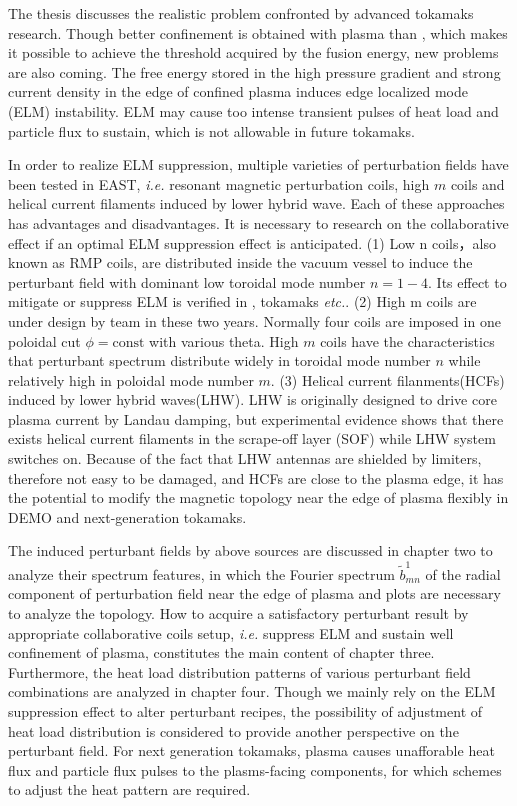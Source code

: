 \begin{eabstract}
  The thesis discusses the realistic problem confronted by advanced tokamaks research. Though better confinement is obtained with \Hmode plasma than \Lmode, which makes it possible to achieve the threshold acquired by the fusion energy, new problems are also coming. The free energy stored in the high pressure gradient and strong current density in the edge of confined plasma induces edge localized mode (ELM) instability. ELM may cause too intense transient pulses of heat load and particle flux to sustain, which is not allowable in future tokamaks.

  In order to realize ELM suppression, multiple varieties of perturbation fields have been tested in EAST, \textit{i.e.} resonant magnetic perturbation coils, high $m$ coils and helical current filaments induced by lower hybrid wave. Each of these approaches has advantages and disadvantages. It is necessary to research on the collaborative effect if an optimal ELM suppression effect is anticipated. (1) Low n coils，also known as RMP coils, are distributed inside the vacuum vessel to induce the perturbant field with dominant low toroidal mode number $n=1-4$. Its effect to mitigate or suppress ELM is verified in \east, \ddd tokamaks \textit{etc.}. (2) High m coils are under design by \east team in these two years. Normally four coils are imposed in one poloidal cut $\phi=\text{const}$ with various theta. High $m$ coils have the characteristics that perturbant spectrum distribute widely in toroidal mode number $n$ while relatively high in poloidal mode number $m$. (3) Helical current filanments(HCFs) induced by lower hybrid waves(LHW). LHW is originally designed to drive core plasma current by Landau damping, but experimental evidence shows that there exists helical current filaments in the scrape-off layer (SOF) while LHW system switches on. Because of the fact that LHW antennas are shielded by limiters, therefore not easy to be damaged, and HCFs are close to the plasma edge, it has the potential to modify the magnetic topology near the edge of plasma flexibly in DEMO and next-generation tokamaks.

  The induced perturbant fields by above sources are discussed in chapter two to analyze their spectrum features, in which the Fourier spectrum $\tilde{b}^1_{mn}$ of the radial component of perturbation field near the edge of plasma and \Poincare plots are necessary to analyze the topology. How to acquire a satisfactory perturbant result by appropriate collaborative coils setup, \textit{i.e.} suppress ELM and sustain well confinement of plasma, constitutes the main content of chapter three. Furthermore, the heat load distribution patterns of various perturbant field combinations are analyzed in chapter four. Though we mainly rely on the ELM suppression effect to alter perturbant recipes, the possibility of adjustment of heat load distribution is considered to provide another perspective on the perturbant field. For next generation tokamaks, \Hmode plasma causes unafforable heat flux and particle flux pulses to the plasms-facing components, for which schemes to adjust the heat pattern are required.
\end{eabstract}

